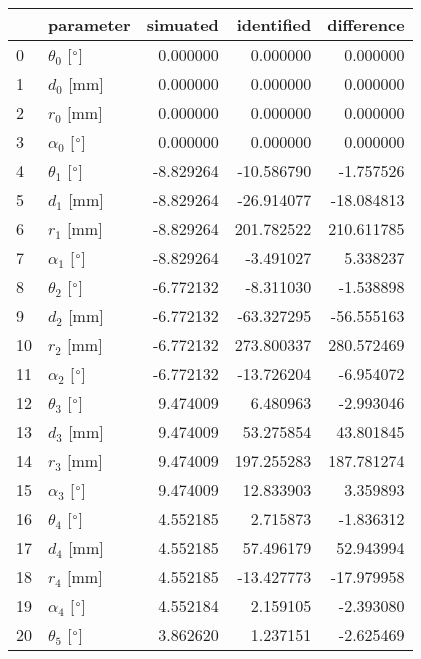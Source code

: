 \documentclass{standalone}%
\begin{document}
%
\normalsize%
\begin{tabular}{llrrr}
\toprule
{} &                 parameter &  simuated &  identified &  difference \\
\midrule
0  &  $\theta_{0}$ [$\degree$] &  0.000000 &    0.000000 &    0.000000 \\
1  &              $d_{0}$ [mm] &  0.000000 &    0.000000 &    0.000000 \\
2  &              $r_{0}$ [mm] &  0.000000 &    0.000000 &    0.000000 \\
3  &  $\alpha_{0}$ [$\degree$] &  0.000000 &    0.000000 &    0.000000 \\
4  &  $\theta_{1}$ [$\degree$] & -8.829264 &  -10.586790 &   -1.757526 \\
5  &              $d_{1}$ [mm] & -8.829264 &  -26.914077 &  -18.084813 \\
6  &              $r_{1}$ [mm] & -8.829264 &  201.782522 &  210.611785 \\
7  &  $\alpha_{1}$ [$\degree$] & -8.829264 &   -3.491027 &    5.338237 \\
8  &  $\theta_{2}$ [$\degree$] & -6.772132 &   -8.311030 &   -1.538898 \\
9  &              $d_{2}$ [mm] & -6.772132 &  -63.327295 &  -56.555163 \\
10 &              $r_{2}$ [mm] & -6.772132 &  273.800337 &  280.572469 \\
11 &  $\alpha_{2}$ [$\degree$] & -6.772132 &  -13.726204 &   -6.954072 \\
12 &  $\theta_{3}$ [$\degree$] &  9.474009 &    6.480963 &   -2.993046 \\
13 &              $d_{3}$ [mm] &  9.474009 &   53.275854 &   43.801845 \\
14 &              $r_{3}$ [mm] &  9.474009 &  197.255283 &  187.781274 \\
15 &  $\alpha_{3}$ [$\degree$] &  9.474009 &   12.833903 &    3.359893 \\
16 &  $\theta_{4}$ [$\degree$] &  4.552185 &    2.715873 &   -1.836312 \\
17 &              $d_{4}$ [mm] &  4.552185 &   57.496179 &   52.943994 \\
18 &              $r_{4}$ [mm] &  4.552185 &  -13.427773 &  -17.979958 \\
19 &  $\alpha_{4}$ [$\degree$] &  4.552184 &    2.159105 &   -2.393080 \\
20 &  $\theta_{5}$ [$\degree$] &  3.862620 &    1.237151 &   -2.625469 \\

\end{tabular}
\end{document}
